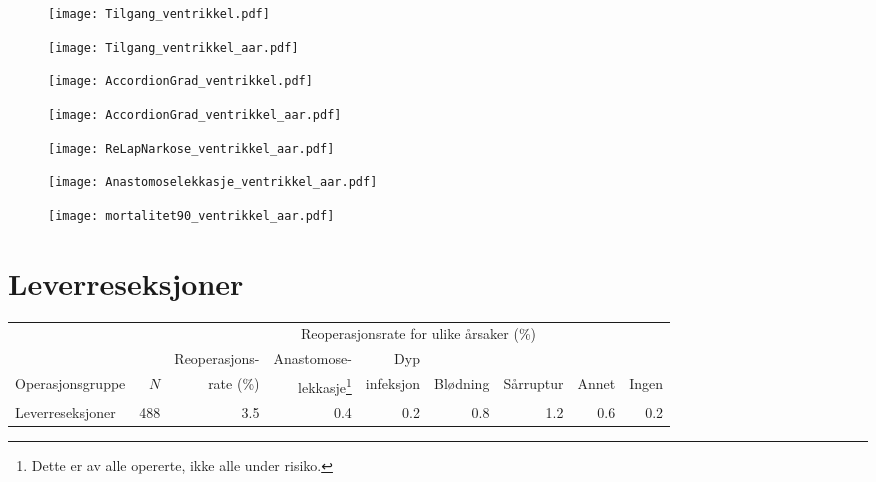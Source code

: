 \documentclass[norsk,a4paper]{article}\usepackage[]{graphicx}\usepackage[]{color}
\begin{document}
\begin{figure}[ht]
\centering
\texttt{[image: Tilgang\_ventrikkel.pdf]}
\caption{}
\end{figure}

\begin{figure}[ht]
\centering
\texttt{[image: Tilgang\_ventrikkel\_aar.pdf]}
\caption{}
\end{figure}

\begin{figure}[ht]
\centering
\texttt{[image: AccordionGrad\_ventrikkel.pdf]}
\caption{}
\end{figure}

\begin{figure}[ht]
\centering
\texttt{[image: AccordionGrad\_ventrikkel\_aar.pdf]}
\caption{}
\end{figure}

\begin{figure}[ht]
\centering
\texttt{[image: ReLapNarkose\_ventrikkel\_aar.pdf]}
\caption{}
\end{figure}

\begin{figure}[ht]
\centering
\texttt{[image: Anastomoselekkasje\_ventrikkel\_aar.pdf]}
\caption{}
\end{figure}

\begin{figure}[ht]
\centering
\texttt{[image: mortalitet90\_ventrikkel\_aar.pdf]}
\caption{}
\end{figure}

\clearpage


%
%

\section{Leverreseksjoner}

\begin{table}[htb]
\begin{minipage}{\textwidth}
\centering
\begin{tabular}{lrrrrrrrr}
  \toprule
  & & & \multicolumn{4}{c}{Reoperasjonsrate for ulike årsaker (\%)} \\
 \cline{4-9} 
 & & Reoperasjons- & Anastomose- & Dyp &&&&  \\
 Operasjonsgruppe & $N$ & rate (\%) & lekkasje\footnote[2]{Dette er av alle opererte, ikke
alle under risiko.} & infeksjon & Blødning & Sårruptur & Annet & Ingen \\
 \midrule
Leverreseksjoner & 488 & 3.5 & 0.4 & 0.2 & 0.8 & 1.2 & 0.6 & 0.2 \\ 
   \bottomrule
\end{tabular}

\end{minipage}
\end{table}
\end{document}
